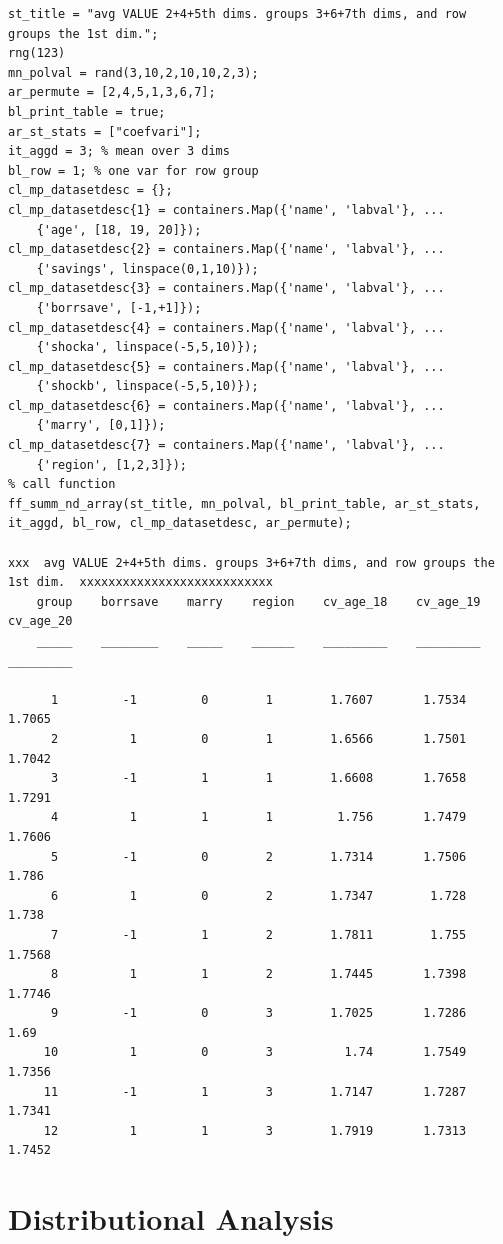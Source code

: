 \documentclass[
]{book}
\begin{document}
\begin{verbatim}
st_title = "avg VALUE 2+4+5th dims. groups 3+6+7th dims, and row groups the 1st dim.";
rng(123)
mn_polval = rand(3,10,2,10,10,2,3);
ar_permute = [2,4,5,1,3,6,7];
bl_print_table = true;
ar_st_stats = ["coefvari"];
it_aggd = 3; % mean over 3 dims
bl_row = 1; % one var for row group
cl_mp_datasetdesc = {};
cl_mp_datasetdesc{1} = containers.Map({'name', 'labval'}, ...
    {'age', [18, 19, 20]});
cl_mp_datasetdesc{2} = containers.Map({'name', 'labval'}, ...
    {'savings', linspace(0,1,10)});
cl_mp_datasetdesc{3} = containers.Map({'name', 'labval'}, ...
    {'borrsave', [-1,+1]});
cl_mp_datasetdesc{4} = containers.Map({'name', 'labval'}, ...
    {'shocka', linspace(-5,5,10)});
cl_mp_datasetdesc{5} = containers.Map({'name', 'labval'}, ...
    {'shockb', linspace(-5,5,10)});
cl_mp_datasetdesc{6} = containers.Map({'name', 'labval'}, ...
    {'marry', [0,1]});
cl_mp_datasetdesc{7} = containers.Map({'name', 'labval'}, ...
    {'region', [1,2,3]});
% call function
ff_summ_nd_array(st_title, mn_polval, bl_print_table, ar_st_stats, it_aggd, bl_row, cl_mp_datasetdesc, ar_permute);

xxx  avg VALUE 2+4+5th dims. groups 3+6+7th dims, and row groups the 1st dim.  xxxxxxxxxxxxxxxxxxxxxxxxxxx
    group    borrsave    marry    region    cv_age_18    cv_age_19    cv_age_20
    _____    ________    _____    ______    _________    _________    _________

      1         -1         0        1        1.7607       1.7534       1.7065  
      2          1         0        1        1.6566       1.7501       1.7042  
      3         -1         1        1        1.6608       1.7658       1.7291  
      4          1         1        1         1.756       1.7479       1.7606  
      5         -1         0        2        1.7314       1.7506        1.786  
      6          1         0        2        1.7347        1.728        1.738  
      7         -1         1        2        1.7811        1.755       1.7568  
      8          1         1        2        1.7445       1.7398       1.7746  
      9         -1         0        3        1.7025       1.7286         1.69  
     10          1         0        3          1.74       1.7549       1.7356  
     11         -1         1        3        1.7147       1.7287       1.7341  
     12          1         1        3        1.7919       1.7313       1.7452  
\end{verbatim}

\hypertarget{distributional-analysis}{%
\chapter{Distributional Analysis}\label{distributional-analysis}}
\end{document}
